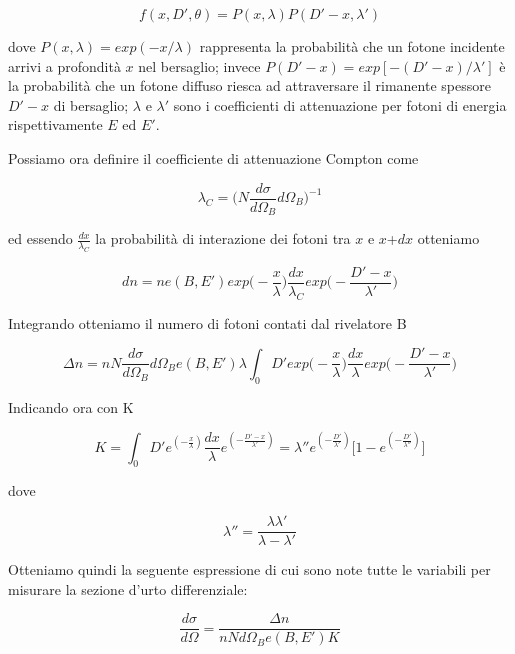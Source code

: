 \documentclass[italian,11pt]{report}
\begin{document}
\begin{equation}
f(x,D',\theta)=P(x,\lambda)P(D'-x,\lambda')
\end{equation}

dove $P(x,\lambda)=exp(-x/\lambda)$ rappresenta la probabilità che un fotone incidente arrivi a profondità $x$ nel bersaglio; invece $P(D'-x)=exp[-(D'-x)/\lambda']$ è la probabilità che un fotone diffuso riesca ad attraversare il rimanente spessore $D'-x$ di bersaglio; $\lambda$ e $\lambda'$ sono i coefficienti di attenuazione per fotoni di energia rispettivamente $E$ ed $E'$.

Possiamo ora definire il coefficiente di attenuazione Compton come

\begin{equation}
\lambda_C=\Biggl(N\frac{d\sigma}{d\Omega_B}d\Omega_B\Biggl)^{-1}
\end{equation}

ed essendo $\frac{dx}{\lambda_C}$ la probabilità di interazione dei fotoni tra $x$ e $x$+$dx$ otteniamo

\begin{equation}
dn=ne(B,E')exp\Biggl(-\frac{x}{\lambda}\Biggl)\frac{dx}{\lambda_C}exp\Biggl(-\frac{D'-x}{\lambda'}\Biggl)
\end{equation}

Integrando otteniamo il numero di fotoni contati dal rivelatore B

\begin{equation}
\Delta n=nN\frac{d\sigma}{d\Omega_B}d\Omega_{B}e(B,E')\lambda\int_{0}{D'}{exp\Biggl(-\frac{x}{\lambda}\Biggl)\frac{dx}{\lambda}exp\Biggl(-\frac{D'-x}{\lambda'}\Biggl)}
\end{equation}

Indicando ora con K

\begin{equation}
K=\int_{0}{D'}{e^{(-\frac{x}{\lambda})}\frac{dx}{\lambda}e^{(-\frac{D'-x}{\lambda'})}}=\lambda''e^{(-\frac{D'}{\lambda'})}\Biggl[1-e^{(-\frac{D'}{\lambda''})}\Biggl]
\end{equation}

dove

\begin{equation}
\lambda''=\frac{\lambda\lambda'}{\lambda-\lambda'}
\end{equation}

Otteniamo quindi la seguente espressione di cui sono note tutte le variabili per misurare la sezione d'urto differenziale:

\begin{equation}
\frac{d\sigma}{d\Omega}=\frac{\Delta n}{nNd\Omega_Be(B,E')K}
\end{equation}
\end{document}
